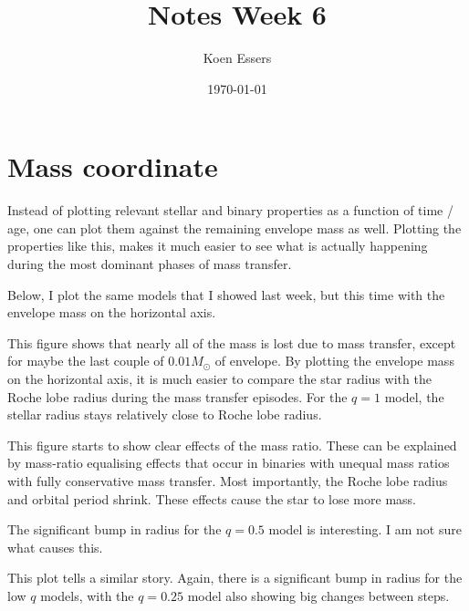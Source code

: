 \documentclass[a4paper,10pt]{article}
\title{Notes Week 6}
\author{Koen Essers}
\date{\today}
\begin{document}
\setuplayout
\section{Mass coordinate}

Instead of plotting relevant stellar and binary properties as a function of time / age, one can plot them against the remaining envelope mass as well.
Plotting the properties like this, makes it much easier to see what is actually happening during the most dominant phases of mass transfer.

Below, I plot the same models that I showed last week, but this time with the envelope mass on the horizontal axis.
\begin{figure}[ht]
    \centering
\end{figure}

This figure shows that nearly all of the mass is lost due to mass transfer, except for maybe the last couple of \(0.01 M_\odot \) of envelope. By plotting the envelope mass on the horizontal axis, it is much easier to compare the star radius with the Roche lobe radius during the mass transfer episodes. For the \(q=1\) model, the stellar radius stays relatively close to Roche lobe radius.

\begin{figure}[ht]
    \centering
\end{figure}

This figure starts to show clear effects of the mass ratio.
These can be explained by mass-ratio equalising effects that occur in binaries with unequal mass ratios with fully conservative mass transfer.
Most importantly, the Roche lobe radius and orbital period shrink. These effects cause the star to lose more mass.

The significant bump in radius for the \(q=0.5\) model is interesting. I am not sure what causes this. 

\begin{figure}[ht]
    \centering
\end{figure}

This plot tells a similar story. Again, there is a significant bump in radius for the low \(q\) models, with the \(q=0.25\) model also showing big changes between steps.

\nextpage

\begin{figure}[ht]
    \centering
\end{figure}
\end{document}
